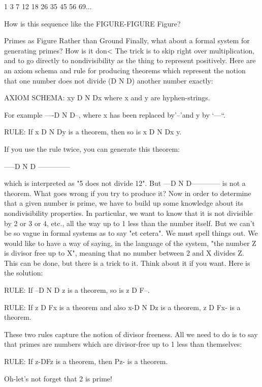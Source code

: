 1       3       7      12      18      26      35     45      56      69... 

How is this sequence like the FIGURE-FIGURE Figure? 



Primes as Figure Rather than Ground Finally, what about a formal system for generating primes? How is it don< The trick is to skip right over multiplication, and to go directly to nondivisibility as the thing to represent positively. Here are an axiom schema and rule for producing theorems which represent the notion that one number does not divide (D N D) another number exactly: 

AXIOM SCHEMA: xy D N Dx where x and y are hyphen-strings. 

For example ----D N D--, where x has been replaced by'--'and y by ‘---“. 







RULE: If x D N Dy is a theorem, then so is x D N Dx y. 

If you use the rule twice, you can generate this theorem: 

-----D N D -------------- 

which is interpreted as "5 does not divide 12". But ---D N D------------ is not a theorem. What goes wrong if you try to produce it? Now in order to determine that a given number is prime, we have to build up some knowledge about its nondivisibility properties. In particular, we want to know that it is not divisible by 2 or 3 or 4, etc., all the way up to 1 less than the number itself. But we can't be so vague in formal systems as to say "et cetera". We must spell things out. We would like to have a way of saying, in the language of the system, "the number Z is divisor free up to X", meaning that no number between 2 and X divides Z. This can be done, but there is a trick to it. Think about it if you want. Here is the solution: 

RULE: If --D N D z is a theorem, so is z D F--. 

RULE: If z D Fx is a theorem and also x-D N Dz is a theorem, z D Fx- is a theorem. 

These two rules capture the notion of divisor freeness. All we need to do is to say that primes are numbers which are divisor-free up to 1 less than themselves: 

RULE: If z-DFz is a theorem, then Pz- is a theorem. 

Oh-let's not forget that 2 is prime! 

